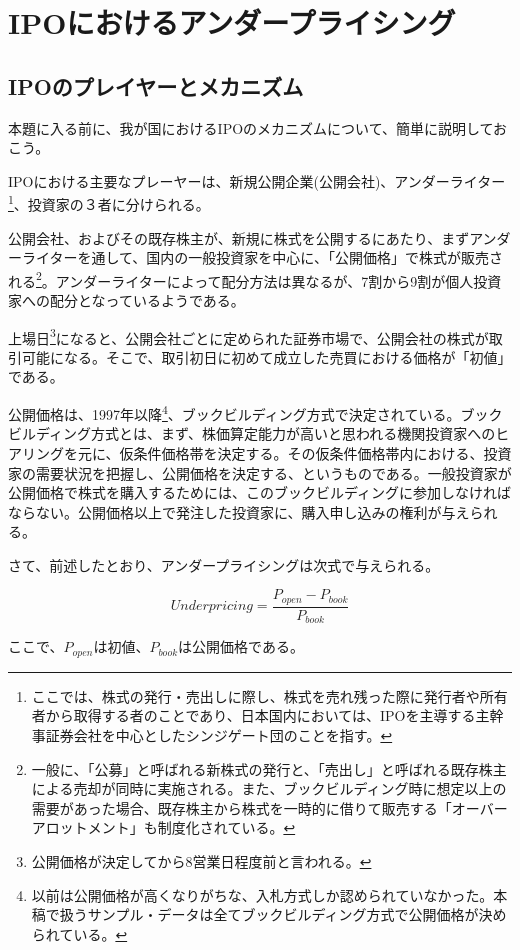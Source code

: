 \documentclass{jsarticle}
\begin{document}
\newpage
\section{IPOにおけるアンダープライシング}

\subsection{IPOのプレイヤーとメカニズム}
本題に入る前に、我が国におけるIPOのメカニズムについて、簡単に説明しておこう。\par
IPOにおける主要なプレーヤーは、新規公開企業(公開会社)、アンダーライター\footnote[3]{ここでは、株式の発行・売出しに際し、株式を売れ残った際に発行者や所有者から取得する者のことであり、日本国内においては、IPOを主導する主幹事証券会社を中心としたシンジゲート団のことを指す。}、投資家の３者に分けられる。\par
公開会社、およびその既存株主が、新規に株式を公開するにあたり、まずアンダーライターを通して、国内の一般投資家を中心に、「公開価格」で株式が販売される\footnote[4]{一般に、「公募」と呼ばれる新株式の発行と、「売出し」と呼ばれる既存株主による売却が同時に実施される。また、ブックビルディング時に想定以上の需要があった場合、既存株主から株式を一時的に借りて販売する「オーバーアロットメント」も制度化されている。}。アンダーライターによって配分方法は異なるが、7割から9割が個人投資家への配分となっているようである。\par
上場日\footnote[5]{公開価格が決定してから8営業日程度前と言われる。}になると、公開会社ごとに定められた証券市場で、公開会社の株式が取引可能になる。そこで、取引初日に初めて成立した売買における価格が「初値」である。\par
公開価格は、1997年以降\footnote[6]{以前は公開価格が高くなりがちな、入札方式しか認められていなかった。本稿で扱うサンプル・データは全てブックビルディング方式で公開価格が決められている。}、ブックビルディング方式で決定されている。ブックビルディング方式とは、まず、株価算定能力が高いと思われる機関投資家へのヒアリングを元に、仮条件価格帯を決定する。その仮条件価格帯内における、投資家の需要状況を把握し、公開価格を決定する、というものである。一般投資家が公開価格で株式を購入するためには、このブックビルディングに参加しなければならない。公開価格以上で発注した投資家に、購入申し込みの権利が与えられる。\\ \par
さて、前述したとおり、アンダープライシングは次式で与えられる。

\begin{equation}
Underpricing = \frac{P_{open} - P_{book}}{P_{book}} \nonumber
\end{equation}
\par
ここで、$P_{open}$は初値、$P_{book}$は公開価格である。
\end{document}
